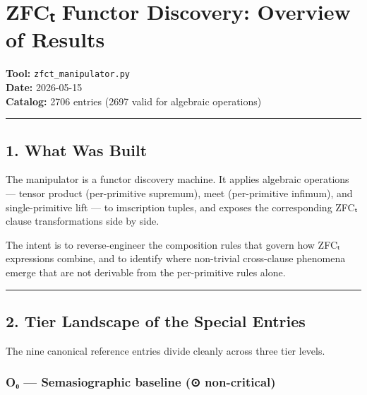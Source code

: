 \section{ZFCₜ Functor Discovery: Overview of
Results}\label{zfcux209c-functor-discovery-overview-of-results}

\textbf{Tool:} \texttt{zfct\_manipulator.py}\\
\textbf{Date:} 2026-05-15\\
\textbf{Catalog:} 2706 entries (2697 valid for algebraic operations)

\begin{center}\rule{0.5\linewidth}{0.5pt}\end{center}

\subsection{1. What Was Built}\label{what-was-built}

The manipulator is a functor discovery machine. It applies algebraic
operations --- tensor product (per-primitive supremum), meet
(per-primitive infimum), and single-primitive lift --- to imscription
tuples, and exposes the corresponding ZFCₜ clause transformations side
by side.

The intent is to reverse-engineer the composition rules that govern how
ZFCₜ expressions combine, and to identify where non-trivial cross-clause
phenomena emerge that are not derivable from the per-primitive rules
alone.

\begin{center}\rule{0.5\linewidth}{0.5pt}\end{center}

\subsection{2. Tier Landscape of the Special
Entries}\label{tier-landscape-of-the-special-entries}

The nine canonical reference entries divide cleanly across three tier
levels.

\subsubsection{O₀ --- Semasiographic baseline (⊙
non-critical)}\label{oux2080-semasiographic-baseline-ux3c6-non-critical}

